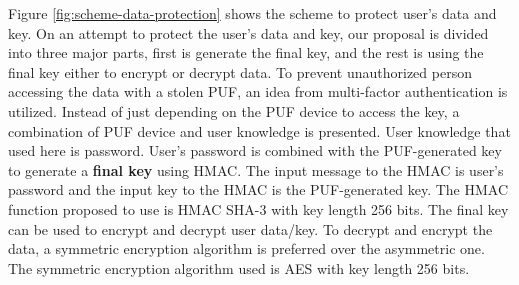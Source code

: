 Figure \ref{fig:scheme-data-protection} shows the scheme to protect user's data and key. On an attempt to protect the user's data and key, our proposal is divided into three major parts, first is generate the final key, and the rest is using the final key either to encrypt or decrypt data.
To prevent unauthorized person accessing the data with a stolen PUF, an idea from multi-factor authentication is utilized. Instead of just depending on the PUF device to access the key, a combination of PUF device and user knowledge is presented. User knowledge that used here is password.
User's password is combined with the PUF-generated key to generate a \textbf{final key} using HMAC. The input message to the HMAC is user's password and the input key to the HMAC is the PUF-generated key. The HMAC function proposed to use is HMAC SHA-3 with key length 256 bits.
The final key can be used to encrypt and decrypt user data/key. To decrypt and encrypt the data, a symmetric encryption algorithm is preferred over the asymmetric one. The symmetric encryption algorithm used is AES with key length 256 bits.

